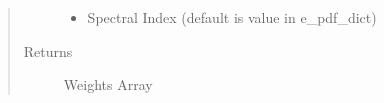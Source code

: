 \documentclass[letterpaper,10pt,english]{sphinxmanual}
\begin{document}
\begin{fulllineitems}
\begin{fulllineitems}
\begin{quote}
\begin{description}
\begin{itemize}
\item {} 
 \textendash{} Spectral Index (default is value in e\_pdf\_dict)

\end{itemize}

\item[{Returns}] \leavevmode
Weights Array

\end{description}\end{quote}

\end{fulllineitems}


\end{fulllineitems}

\end{document}

